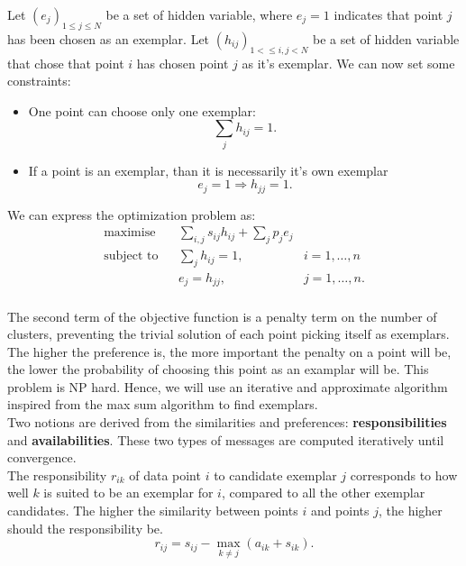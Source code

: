 \documentclass{ipol}
\begin{document}
Let $(e_j)_{1 \leq j \leq N}$ be a set of hidden variable, where $e_j = 1$
indicates that point $j$ has been chosen as an exemplar. Let $(h_{ij})_{1 <
\leq i, j < N}$ be a set of hidden variable that chose that point $i$ has
chosen point $j$ as it's exemplar. We can now set some constraints:

\begin{itemize}
\item One point can choose only one exemplar:
\begin{equation*}
\sum_{j} h_{ij} = 1.
\end{equation*}
\item If a point is an exemplar, than it is necessarily it's own exemplar
\begin{equation*}
e_{j} = 1 \Rightarrow h_{jj} = 1.
\end{equation*}
\end{itemize}

We can express the optimization problem as:
\begin{equation*}
\renewcommand{\arraystretch}{2}
\begin{array}{ccll}
\text{maximise} & & \sum_{i, j} s_{ij} h_{ij} + \sum_{j} p_j e_j & \\
\text{subject to} &  & \sum_{j} h_{ij} = 1, & i = 1, \dots, n \\
		  &  & e_{j} = h_{jj}, & j = 1, \dots, n.\\
\end{array}
\end{equation*}


The second term of the objective function is a penalty term on the number of clusters, preventing the
trivial solution of each point picking itself as exemplars. The higher the
preference is, the more important the penalty on a point will be, the lower
the probability of choosing this point as an examplar will be. This problem is
NP hard. Hence, we will use an iterative and approximate algorithm inspired
from the max sum algorithm to find exemplars. \\

Two notions are derived from the similarities and preferences:
\textbf{responsibilities} and \textbf{availabilities}. These two types of
messages are computed iteratively until convergence.\\

The responsibility $r_{ik}$ of data point $i$ to
candidate exemplar $j$ corresponds to how well $k$ is suited to be an exemplar
for $i$, compared to all the other exemplar candidates. The higher the
similarity between points $i$ and points $j$, the higher should the
responsibility be.
\begin{equation*}
r_{ij} = s_{ij} - \max_{k \neq j} (a_{ik} + s_{ik}).
\end{equation*}
\\
\end{document}
